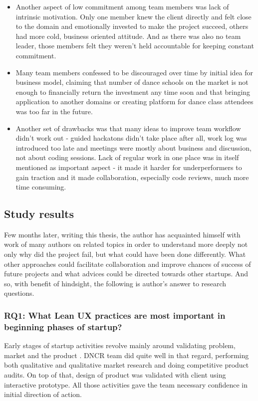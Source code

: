 \documentclass{article}
\begin{document}
\begin{itemize}
\item Another aspect of low commitment among team members was lack of intrinsic motivation. Only one member knew the client directly and felt close to the domain and emotionally invested to make the project succeed, others had more cold, business oriented attitude. And as there was also no team leader, those members felt they weren't held accountable for keeping constant commitment.
\item Many team members confessed to be discouraged over time by initial idea for business model, claiming that number of dance schools on the market is not enough to financially return the investment any time soon and that bringing application to another domains or creating platform for dance class attendees was too far in the future.
\item Another set of drawbacks was that many ideas to improve team workflow didn't work out - guided hackatons didn't take place after all, work log was introduced too late and meetings were mostly about business and discussion, not about coding sessions. Lack of regular work in one place was in itself mentioned as important aspect - it made it harder for underperformers to gain traction and it made collaboration, especially code reviews, much more time consuming.
\end{itemize}

\subsection{Study results}
\label{sec:research-questions}
Few months later, writing this thesis, the author has acquainted himself with work of many authors on related topics in order to understand more deeply not only why did the project fail, but what could have been done differently. What other approaches could facilitate collaboration and improve chances of success of future projects and what advices could be directed towards other startups. And so, with benefit of hindsight, the following is author's answer to research questions.


\subsubsection{RQ1: What Lean UX practices are most important in beginning phases of startup?}
Early stages of startup activities revolve mainly around validating problem, market and the product \cite{klein2013ux}. DNCR team did quite well in that regard, performing both qualitative and qualitative market research and doing competitive product audits. On top of that, design of product was validated with client using interactive prototype. All those activities gave the team necessary confidence in initial direction of action.
\end{document}
